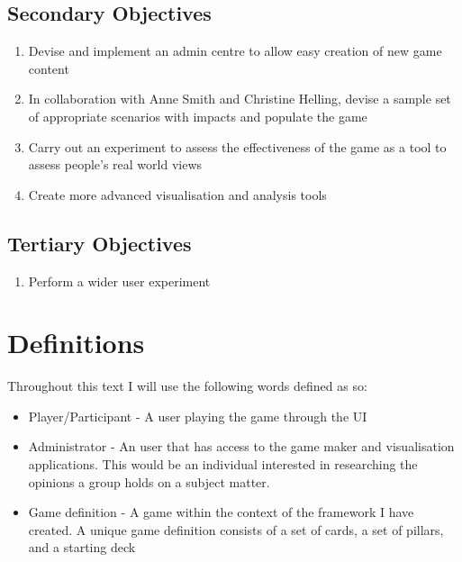 \subsection{Secondary Objectives}
\begin{enumerate}[label=\textbf{SO.\arabic*}]
    \item Devise and implement an admin centre to allow easy creation of new game content
    \item \label{SO:2} In collaboration with Anne Smith and Christine Helling, devise a sample set of appropriate scenarios with impacts and populate the game
    \item Carry out an experiment to assess the effectiveness of the game as a tool to assess people's real world views
    \item Create more advanced visualisation and analysis tools
\end{enumerate}
\subsection{Tertiary Objectives}
\begin{enumerate}[label=\textbf{TO.\arabic*}]
    \item Perform a wider user experiment
\end{enumerate}

\section{Definitions}
Throughout this text I will use the following words defined as so:
\begin{itemize}
    \item Player/Participant - A user playing the game through the UI
    \item Administrator - An user that has access to the game maker and visualisation applications. This would be an individual interested in researching the opinions a group holds on a subject matter.
    \item Game definition - A game within the context of the framework I have created. A unique game definition consists of a set of cards, a set of pillars, and a starting deck
\end{itemize}